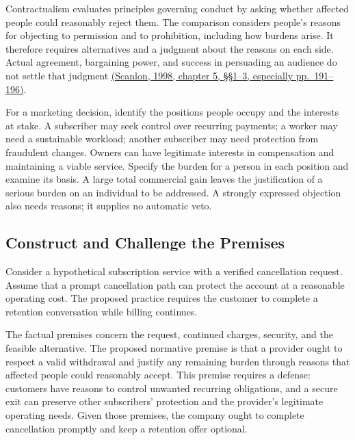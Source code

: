\noindent \noindent Contractualism evaluates principles governing conduct by
asking whether affected people could reasonably reject them. The
comparison considers people's reasons for objecting to permission and to
prohibition, including how burdens arise. It therefore requires
alternatives and a judgment about the reasons on each side. Actual
agreement, bargaining power, and success in persuading an audience do
not settle that judgment
\href{https://e-edu.nbu.bg/pluginfile.php/314831/mod_resource/content/0/scanlon_5.1-3.pdf}{(Scanlon,
1998, chapter 5, §§1--3, especially pp.~191--196)}.

For a marketing decision, identify the positions people occupy and the
interests at stake. A subscriber may seek control over recurring
payments; a worker may need a sustainable workload; another subscriber
may need protection from fraudulent changes. Owners can have legitimate
interests in compensation and maintaining a viable service. Specify the
burden for a person in each position and examine its basis. A large
total commercial gain leaves the justification of a serious burden on an
individual to be addressed. A strongly expressed objection also needs
reasons; it supplies no automatic veto.

\hypertarget{M09-construct-and-challenge-the-premises}{%
\subsection{Construct and Challenge the
Premises}\label{M09-construct-and-challenge-the-premises}}

\noindent \noindent Consider a hypothetical subscription service with a verified
cancellation request. Assume that a prompt cancellation path can protect
the account at a reasonable operating cost. The proposed practice
requires the customer to complete a retention conversation while billing
continues.

The factual premises concern the request, continued charges, security,
and the feasible alternative. The proposed normative premise is that a
provider ought to respect a valid withdrawal and justify any remaining
burden through reasons that affected people could reasonably accept.
This premise requires a defense: customers have reasons to control
unwanted recurring obligations, and a secure exit can preserve other
subscribers' protection and the provider's legitimate operating needs.
Given those premises, the company ought to complete cancellation
promptly and keep a retention offer optional.

